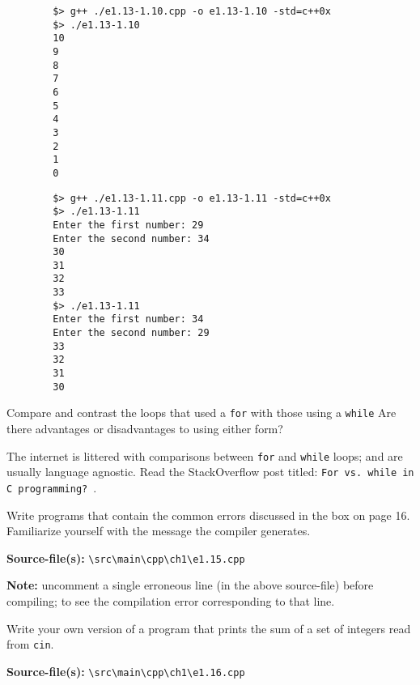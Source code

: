\documentclass[12pt, a4paper]{article}
\begin{document}
    \begin{verbatim}
        $> g++ ./e1.13-1.10.cpp -o e1.13-1.10 -std=c++0x
        $> ./e1.13-1.10
        10
        9
        8
        7
        6
        5
        4
        3
        2
        1
        0
    \end{verbatim}

    \begin{verbatim}
        $> g++ ./e1.13-1.11.cpp -o e1.13-1.11 -std=c++0x
        $> ./e1.13-1.11
        Enter the first number: 29
        Enter the second number: 34
        30
        31
        32
        33
        $> ./e1.13-1.11
        Enter the first number: 34
        Enter the second number: 29
        33
        32
        31
        30
    \end{verbatim}

    \bigskip
    \begin{tcolorbox}[title={Exercise: 1.14}]
        Compare and contrast the loops that used a \texttt{for} with those using a \texttt{while}
        Are there advantages or disadvantages to using either form?
    \end{tcolorbox}

    \noindent The internet is littered with comparisons between \texttt{for} and \texttt{while} loops; and are usually language agnostic.
    Read the StackOverflow post titled: \texttt{For vs. while in C programming?}~\cite{stackoverflow-for-while}.

    \bigskip
    \begin{tcolorbox}[title={Exercise: 1.15}]
        Write programs that contain the common errors discussed in the box on page 16.
        Familiarize yourself with the message the compiler generates.
    \end{tcolorbox}
    \noindent\textbf{Source-file(s):} \texttt{\textbackslash src\textbackslash main\textbackslash cpp\textbackslash ch1\textbackslash e1.15.cpp}

    \noindent\textbf{Note:} uncomment a single erroneous line (in the above source-file) before compiling; to see the compilation error corresponding to that line.

    \bigskip
    \begin{tcolorbox}[title={Exercise: 1.16}]
        Write your own version of a program that prints the sum of a set of integers read from \texttt{cin}.
    \end{tcolorbox}
    \noindent\textbf{Source-file(s):} \texttt{\textbackslash src\textbackslash main\textbackslash cpp\textbackslash ch1\textbackslash e1.16.cpp}
\end{document}
